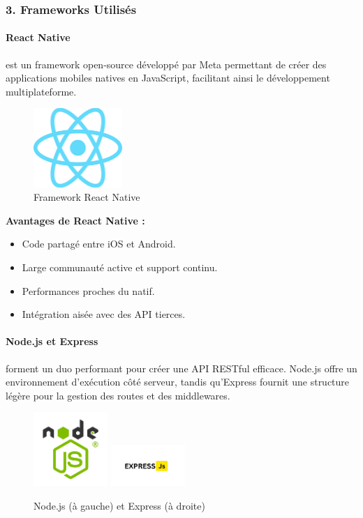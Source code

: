 \subsubsection{3. Frameworks Utilisés}

\paragraph{React Native} est un framework open-source développé par Meta permettant de créer des applications mobiles natives en JavaScript, facilitant ainsi le développement multiplateforme.

\begin{figure}[H]
    \centering
    \includegraphics[width=0.3\textwidth]{logos/react-native.png}
    \caption{Framework React Native}
\end{figure}

\textbf{Avantages de React Native :}
\begin{itemize}
    \item Code partagé entre iOS et Android.
    \item Large communauté active et support continu.
    \item Performances proches du natif.
    \item Intégration aisée avec des API tierces.
\end{itemize}

\paragraph{Node.js et Express} forment un duo performant pour créer une API RESTful efficace. Node.js offre un environnement d'exécution côté serveur, tandis qu'Express fournit une structure légère pour la gestion des routes et des middlewares.

\begin{figure}[H]
    \centering
    \includegraphics[width=0.25\textwidth]{logos/nodejs.png}
    \hspace{0.05\textwidth}
    \includegraphics[width=0.25\textwidth]{logos/express.png}
    \caption{Node.js (à gauche) et Express (à droite)}
\end{figure}

